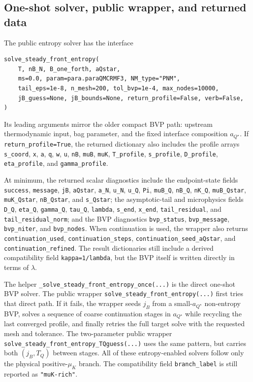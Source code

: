 \documentclass[11pt]{article}
\begin{document}
\subsection{One-shot solver, public wrapper, and returned data}
The public entropy solver has the interface
\begin{verbatim}
solve_steady_front_entropy(
    T, nB_N, B_one_forth, aQstar,
    ms=0.0, param=para.paraQMCRMF3, NM_type="PNM",
    tail_eps=1e-8, n_mesh=200, tol_bvp=1e-4, max_nodes=10000,
    jB_guess=None, jB_bounds=None, return_profile=False, verb=False,
)
\end{verbatim}
Its leading arguments mirror the older compact BVP path: upstream
thermodynamic input, bag parameter, and the fixed interface composition
$a_{Q^\star}$. If \texttt{return\_profile=True}, the returned dictionary also
includes the profile arrays
\texttt{s\_coord}, \texttt{x}, \texttt{a}, \texttt{q}, \texttt{w},
\texttt{u}, \texttt{nB}, \texttt{muB}, \texttt{muK},
\texttt{T\_profile}, \texttt{s\_profile},
\texttt{D\_profile}, \texttt{eta\_profile}, and
\texttt{gamma\_profile}.

At minimum, the returned scalar diagnostics include the endpoint-state fields
\texttt{success}, \texttt{message}, \texttt{jB}, \texttt{aQstar},
\texttt{a\_N}, \texttt{u\_N}, \texttt{u\_Q}, \texttt{Pi},
\texttt{muB\_Q}, \texttt{nB\_Q}, \texttt{nK\_Q}, \texttt{muB\_Qstar},
\texttt{muK\_Qstar}, \texttt{nB\_Qstar}, and \texttt{s\_Qstar}; the
asymptotic-tail and microphysics fields \texttt{D\_Q}, \texttt{eta\_Q},
\texttt{gamma\_Q}, \texttt{tau\_Q}, \texttt{lambda},
\texttt{s\_end}, \texttt{x\_end}, \texttt{tail\_residual}, and
\texttt{tail\_residual\_norm}; and the BVP diagnostics
\texttt{bvp\_status}, \texttt{bvp\_message}, \texttt{bvp\_niter}, and
\texttt{bvp\_nodes}. When continuation is used, the wrapper also returns
\texttt{continuation\_used}, \texttt{continuation\_steps},
\texttt{continuation\_seed\_aQstar}, and
\texttt{continuation\_refined}. The result dictionaries still include a
derived compatibility field \texttt{kappa=1/lambda}, but the BVP itself is
written directly in terms of $\lambda$.

The helper \texttt{\_solve\_steady\_front\_entropy\_once(...)} is the direct
one-shot BVP solver. The public wrapper
\texttt{solve\_steady\_front\_entropy(...)} first tries that direct path. If
it fails, the wrapper seeds $j_B$ from a small-$a_{Q^\star}$ non-entropy BVP,
solves a sequence of coarse continuation stages in $a_{Q^\star}$ while
recycling the last converged profile, and finally retries the full target
solve with the requested mesh and tolerance. The two-parameter public wrapper
\texttt{solve\_steady\_front\_entropy\_TQguess(...)} uses the same pattern,
but carries both $(j_B,T_Q)$ between stages. All of these entropy-enabled
solvers follow only the physical positive-$\mu_K$
branch. The compatibility field \texttt{branch\_label} is still reported as
\texttt{"muK-rich"}.
\end{document}
